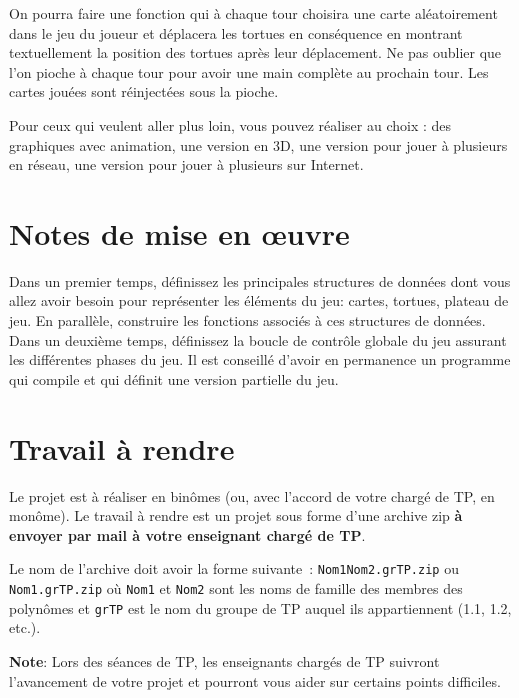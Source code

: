 \documentclass[10pt]{article}
\begin{document}
On pourra faire une fonction qui à chaque tour choisira une carte
aléatoirement dans le jeu du joueur et déplacera les tortues en
conséquence en montrant textuellement la position des tortues après
leur déplacement. Ne pas oublier que l'on pioche à chaque tour pour
avoir une main complète au prochain tour. Les cartes jouées sont
réinjectées sous la pioche.

Pour ceux qui veulent aller plus loin, vous pouvez réaliser au choix
: des graphiques avec animation, une version en 3D, une version pour
jouer à plusieurs en réseau, une version pour jouer à plusieurs sur Internet.

\section{Notes de mise en {\oe}uvre}

Dans un premier temps, définissez les principales structures de données dont vous allez avoir besoin pour représenter les éléments du jeu: cartes, tortues, plateau de jeu. En parallèle, construire les fonctions associés à ces structures de données.
Dans un deuxième temps, définissez la boucle de contrôle globale du jeu assurant les différentes phases du jeu.
Il est conseillé d'avoir en permanence un programme qui compile et qui définit une version partielle du jeu.

\section{Travail à rendre}
Le projet est à réaliser en binômes (ou, avec l'accord de votre 
chargé de TP, en monôme). Le travail à rendre est un projet sous forme 
d'une archive zip {\bf à envoyer par mail à votre enseignant chargé de TP}. 

\medskip
\noindent
Le nom de l'archive doit avoir la forme suivante~: \texttt{Nom1Nom2.grTP.zip} ou 
\texttt{Nom1.grTP.zip} où \texttt{Nom1} et \texttt{Nom2} sont les noms de 
famille des membres des polynômes et \texttt{grTP} est le nom du groupe de TP 
auquel ils appartiennent (1.1, 1.2, etc.).

\medskip
\noindent
{\bf Note}: Lors des séances de TP, les enseignants chargés de TP suivront l'avancement de votre projet et pourront vous aider sur certains points difficiles.
\end{document}
